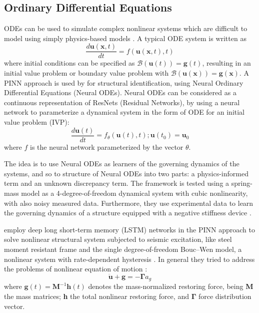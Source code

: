 \documentclass[pdflatex,sn-basic]{sn-jnl}%
\theoremstyle{thmstyleone}%
\theoremstyle{thmstyletwo}%
\theoremstyle{thmstylethree}%
\begin{document}
\subsection{Ordinary Differential Equations}
ODEs can be used to simulate complex nonlinear systems  which are difficult to model using simply physics-based models \citep{Lai2021_StructuralIdentificationPhysics_MylLMNC}. A typical ODE system is written as 
\begin{equation*}
\frac{d \bm{u}(\bm{x}, t)}{dt} = f(\bm{u}(\bm{x},t),t)
\end{equation*}
where initial conditions can be specified as $\mathcal{B}(\bm{u}(t))=  \bm{g}(t)$, resulting in an initial value problem or boundary value problem with  $\mathcal{B}(\bm{u}(\bm{x})) = \bm{g}(\bm{x})$. 
A PINN approach is used by  \cite{Lai2021_StructuralIdentificationPhysics_MylLMNC} for structural identification, using Neural Ordinary Differential Equations (Neural ODEs). Neural ODEs can be considered as a continuous representation of ResNets (Residual Networks), by using a neural network to parameterize a  dynamical system in the form of ODE for an initial value problem (IVP): 
\begin{equation*}
\frac{d \bm{u}(t)}{dt} = f_{\theta}(\bm{u}(t),t)  ; \bm{u}(t_0) = \bm{u}_0
\end{equation*}
where $f$ is the neural network parameterized by the vector $\theta$.

The idea is to use Neural ODEs as learners of the governing dynamics of the systems, and so to structure of Neural ODEs into two parts: a physics-informed term and an unknown discrepancy term. The framework is tested using a spring-mass model as a 4-degree-of-freedom dynamical system with cubic nonlinearity, with also noisy measured data. Furthermore, they use experimental data to learn the governing dynamics of a structure equipped with a negative stiffness device  \citep{Lai2021_StructuralIdentificationPhysics_MylLMNC}.

\cite{Zha2020_PhysicsInformedMulti_LiuZLS} employ deep long short-term memory (LSTM) networks in the PINN approach to solve nonlinear structural system subjected to seismic excitation, like steel moment resistant frame and the  single degree-of-freedom Bouc–Wen model, a nonlinear system with rate-dependent hysteresis \citep{Zha2020_PhysicsInformedMulti_LiuZLS}. 
In general they tried to address the problems of nonlinear equation of motion :
\begin{equation*}
    \ddot{\mathbf{u}} + \mathbf{g} = -\boldsymbol{\Gamma}{a}_g
\end{equation*}
where $\mathbf{g}(t)=\textbf{M}^{-1}\mathbf{h}(t)$ denotes the mass-normalized restoring force, being \textbf{M} the mass matrices; \textbf{h} the total nonlinear restoring force, and $\boldsymbol{\Gamma}$ force distribution vector.
\end{document}
